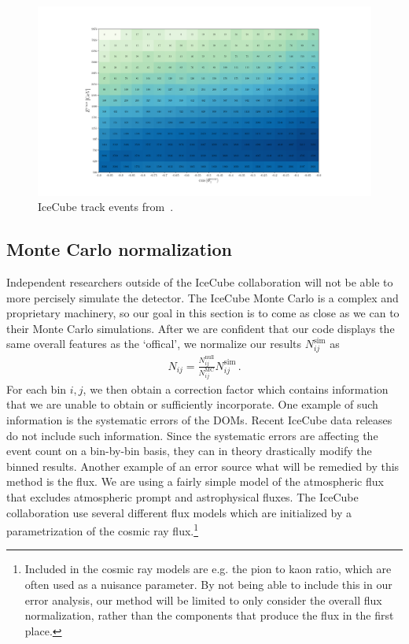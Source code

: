 \begin{figure}
    \centering
    \includegraphics[width=0.8\linewidth]{figures/IC_data.pdf}
    \caption{IceCube track events from~\cite{IC2020}.}\label{fig:IC_data}
\end{figure}

\subsection*{Monte Carlo normalization}
Independent researchers outside of the IceCube collaboration will not be able to more percisely
simulate the detector. The IceCube Monte Carlo is a complex and proprietary machinery, so our goal in this 
section is to come as close as we can to their Monte Carlo simulations. After we are confident that 
our code displays the same overall features as the `offical', we normalize our results $N_{ij}^\text{sim}$ as 
\begin{align}\label{eq:MC_norm}
    N_{ij} = \frac{N_{ij}^\text{null}}{N_{ij}^\text{MC}} N_{ij}^\text{sim}\,.
\end{align}
For each bin $i,j$, we then obtain a correction factor which contains information that we are unable
to obtain or sufficiently incorporate. One example of such information is the systematic errors of the DOMs.
Recent IceCube data releases do not include such information. Since the systematic errors are affecting the 
event count on a bin-by-bin basis, they can in theory drastically modify the binned results. Another example of
an error source what will be remedied by this method is the flux. We are using a fairly simple model of the atmospheric 
flux that excludes atmospheric prompt and astrophysical fluxes. The IceCube collaboration use several different flux models which are initialized 
by a parametrization of the cosmic ray flux.\footnote{Included in the cosmic ray models are e.g. the pion to kaon 
ratio, which are often used as a nuisance parameter. By not being able to include this in our error analysis, our method will 
be limited to only consider the overall flux normalization, rather than the components that produce the flux in the first place.}

